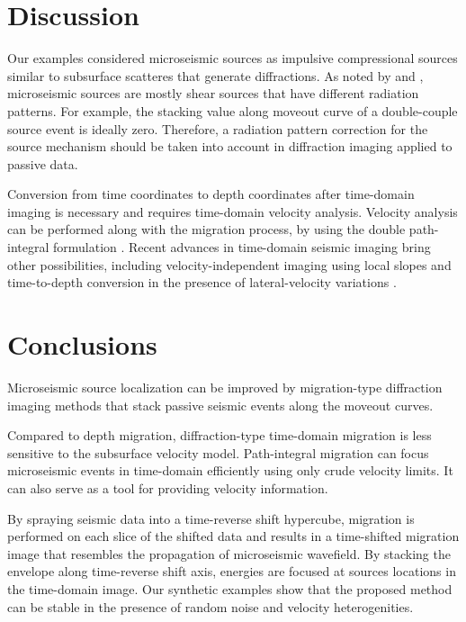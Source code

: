 
\section{Discussion}
Our examples considered microseismic sources as impulsive compressional sources similar to subsurface scatteres that generate diffractions.
As noted by \cite{anikiev2013imaging} and \cite{stanvek2015semblance}, microseismic sources are mostly shear sources that have different radiation patterns.
For example, the stacking value along moveout curve of a double-couple source event is ideally zero.
Therefore, a radiation pattern correction for the source mechanism should be taken into account in diffraction imaging applied to passive data.

Conversion from time coordinates to depth coordinates after time-domain imaging is necessary and requires time-domain velocity analysis.
Velocity analysis can be performed along with the migration process, by using the double path-integral formulation \cite[]{schleicher2009migration,merzlikin2015efficient}.
Recent advances in time-domain seismic imaging bring other possibilities, including velocity-independent imaging using local slopes \cite[]{fomel2007velocity, cooke2009simultaneous} and time-to-depth conversion in the presence of lateral-velocity variations \cite[]{cameron2008time,li2015robust}.

\section{Conclusions}
Microseismic source localization can be improved by migration-type diffraction imaging methods that stack passive seismic events along the moveout curves.

Compared to depth migration, diffraction-type time-domain migration is less sensitive to the subsurface velocity model.
Path-integral migration can focus microseismic events in time-domain efficiently using only crude velocity limits. It can also serve as a tool for providing velocity information.

By spraying seismic data into a time-reverse shift hypercube, migration is performed on each slice of the shifted data and results in a time-shifted migration image that resembles the propagation of microseismic wavefield.
By stacking  the envelope along time-reverse shift axis, energies are focused at sources locations in the time-domain image.
Our synthetic examples show that the proposed method can be stable in the presence
of random noise and velocity heterogenities.

